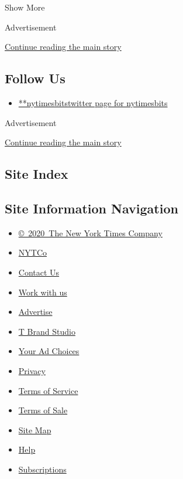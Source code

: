 Show More

Advertisement

\protect\hyperlink{after-mid3}{Continue reading the main story}

\hypertarget{follow-us}{%
\subsection{Follow Us}\label{follow-us}}

\begin{itemize}
\tightlist
\item
  \href{https://twitter.com/nytimesbits}{**nytimesbitstwitter page for
  nytimesbits}
\end{itemize}

Advertisement

\protect\hyperlink{after-mktg}{Continue reading the main story}

\hypertarget{site-index}{%
\subsection{Site Index}\label{site-index}}

\hypertarget{site-information-navigation}{%
\subsection{Site Information
Navigation}\label{site-information-navigation}}

\begin{itemize}
\tightlist
\item
  \href{https://help.nytimes.com/hc/en-us/articles/115014792127-Copyright-notice}{©~2020~The
  New York Times Company}
\end{itemize}

\begin{itemize}
\tightlist
\item
  \href{https://www.nytco.com/}{NYTCo}
\item
  \href{https://help.nytimes.com/hc/en-us/articles/115015385887-Contact-Us}{Contact
  Us}
\item
  \href{https://www.nytco.com/careers/}{Work with us}
\item
  \href{https://nytmediakit.com/}{Advertise}
\item
  \href{http://www.tbrandstudio.com/}{T Brand Studio}
\item
  \href{https://www.nytimes.com/privacy/cookie-policy\#how-do-i-manage-trackers}{Your
  Ad Choices}
\item
  \href{https://www.nytimes.com/privacy}{Privacy}
\item
  \href{https://help.nytimes.com/hc/en-us/articles/115014893428-Terms-of-service}{Terms
  of Service}
\item
  \href{https://help.nytimes.com/hc/en-us/articles/115014893968-Terms-of-sale}{Terms
  of Sale}
\item
  \href{https://spiderbites.nytimes.com}{Site Map}
\item
  \href{https://help.nytimes.com/hc/en-us}{Help}
\item
  \href{https://www.nytimes.com/subscription?campaignId=37WXW}{Subscriptions}
\end{itemize}
